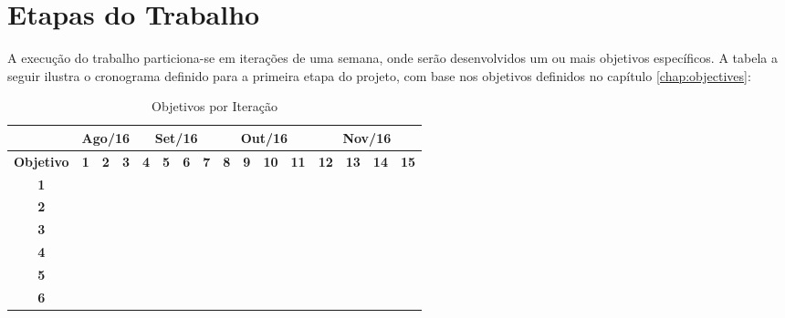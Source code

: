 \chapter{\label{chap:work-plan}Etapas do Trabalho}

A execução do trabalho particiona-se em iterações de uma semana, onde serão
desenvolvidos um ou mais objetivos específicos. A tabela a seguir ilustra o
cronograma definido para a primeira etapa do projeto, com base nos objetivos
definidos no capítulo \ref{chap:objectives}:

\begin{table}[htb!]
\centering
\caption{Objetivos por Iteração}
\label{tab:work-plan}
\begin{tabular}{c|c|c|c|c|c|c|c|c|c|c|c|c|c|c|c|}
\cline{2-16}
{\bf}                                 & \multicolumn{3}{c|}{{\bf Ago/16}} & \multicolumn{4}{c|}{{\bf Set/16}}     & \multicolumn{4}{c|}{{\bf Out/16}}      & \multicolumn{4}{c|}{{\bf Nov/16}}     \\ \hline
\multicolumn{1}{|c|}{{\bf Objetivo}}  & {\bf 1} & {\bf 2} & {\bf 3}	      & {\bf 4} & {\bf 5} & {\bf 6} & {\bf 7} & {\bf 8} & {\bf 9} & {\bf 10} & \bf{11} & \bf{12} & \bf{13} & \bf{14} & \bf{15} \\ \hline
\multicolumn{1}{|c|}{{\bf 1}}         &         &         &               &         &         &         &         &         &         &          &         &         &         &         &         \\ \hline
\multicolumn{1}{|c|}{{\bf 2}}         &         &         &               &         &         &         &         &         &         &          &         &         &         &         &         \\ \hline
\multicolumn{1}{|c|}{{\bf 3}}         &         &         &               &         &         &         &         &         &         &          &         &         &         &         &         \\ \hline
\multicolumn{1}{|c|}{{\bf 4}}         &         &         &               &         &         &         &         &         &         &          &         &         &         &         &         \\ \hline
\multicolumn{1}{|c|}{{\bf 5}}         &         &         &               &         &         &         &         &         &         &          &         &         &         &         &         \\ \hline
\multicolumn{1}{|c|}{{\bf 6}}         &         &         &               &         &         &         &         &         &         &          &         &         &         &         &         \\ \hline

\end{tabular}
\end{table}

